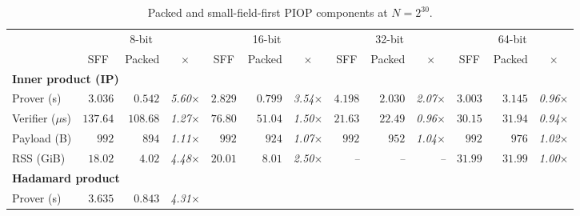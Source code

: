 \begin{table}[!t]
\centering
\setlength{\tabcolsep}{1.5pt}
\begin{threeparttable}
\caption{Packed and small-field-first PIOP components at \(N=2^{30}\).}
\label{table:component}
\small
\scriptsize
\begin{tabular*}{\textwidth}{@{\extracolsep{\fill}}lrrrrrrrrrrrr@{}}
\toprule
& \multicolumn{3}{c}{8-bit}
& \multicolumn{3}{c}{16-bit}
& \multicolumn{3}{c}{32-bit}
& \multicolumn{3}{c}{64-bit} \\
\cmidrule(lr){2-4}\cmidrule(lr){5-7}
\cmidrule(lr){8-10}\cmidrule(l){11-13}
& \multicolumn{1}{c}{SFF}
& \multicolumn{1}{c}{Packed}
& \multicolumn{1}{c}{$\times$}
& \multicolumn{1}{c}{SFF}
& \multicolumn{1}{c}{Packed}
& \multicolumn{1}{c}{$\times$}
& \multicolumn{1}{c}{SFF}
& \multicolumn{1}{c}{Packed}
& \multicolumn{1}{c}{$\times$}
& \multicolumn{1}{c}{SFF}
& \multicolumn{1}{c}{Packed}
& \multicolumn{1}{c}{$\times$} \\
\midrule
\multicolumn{13}{l}{\textbf{Inner product (IP)}} \\
Prover (s)
  & $3.036$ & $0.542$ & \textcolor{black!80}{\textit{5.60}\(\times\)}
  & $2.829$ & $0.799$ & \textcolor{black!80}{\textit{3.54}\(\times\)}
  & $4.198$ & $2.030$ & \textcolor{black!80}{\textit{2.07}\(\times\)}
  & $3.003$ & $3.145$ & \textcolor{black!80}{\textit{0.96}\(\times\)} \\
Verifier ($\mu$s)
  & $137.64$ & $108.68$ & \textcolor{black!80}{\textit{1.27}\(\times\)}
  & $76.80$ & $51.04$ & \textcolor{black!80}{\textit{1.50}\(\times\)}
  & $21.63$ & $22.49$ & \textcolor{black!80}{\textit{0.96}\(\times\)}
  & $30.15$ & $31.94$ & \textcolor{black!80}{\textit{0.94}\(\times\)} \\
Payload (B)
  & $992$ & $894$ & \textcolor{black!80}{\textit{1.11}\(\times\)}
  & $992$ & $924$ & \textcolor{black!80}{\textit{1.07}\(\times\)}
  & $992$ & $952$ & \textcolor{black!80}{\textit{1.04}\(\times\)}
  & $992$ & $976$ & \textcolor{black!80}{\textit{1.02}\(\times\)} \\
RSS (GiB)
  & $18.02$ & $4.02$ & \textcolor{black!80}{\textit{4.48}\(\times\)}
  & $20.01$ & $8.01$ & \textcolor{black!80}{\textit{2.50}\(\times\)}
  & \textit{--} & \textit{--} & \textcolor{black!80}{\textit{--}}
  & $31.99$ & $31.99$ & \textcolor{black!80}{\textit{1.00}\(\times\)} \\
\midrule
\multicolumn{13}{l}{\textbf{Hadamard product}} \\
Prover (s)
  & $3.635$ & $0.843$ & \textcolor{black!80}{\textit{4.31}\(\times\)}

\end{tabular*}
\end{threeparttable}
\end{table}
